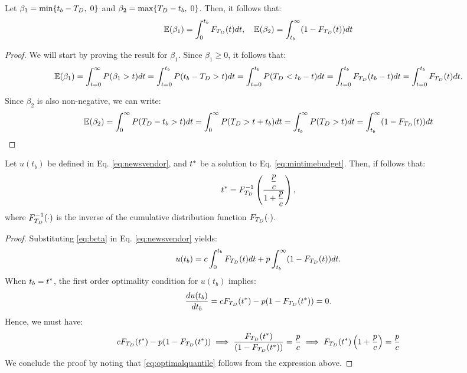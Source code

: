 \begin{lemma}
    Let $\beta_1 = \min\{ t_b - T_D, \; 0 \}$ and $\beta_2 = \max \{ T_D - t_b, \; 0 \}$. Then, it follows that:
\begin{equation} \label{eq:beta}
 \mathbb{E}(\beta_1 ) =  \int_0^{t_b} F_{T_D}(t) dt, \quad    \mathbb{E}(\beta_2 ) = \int_{t_b}^\infty (1 - F_{T_D}(t) ) dt
\end{equation}
\end{lemma}
%
\begin{proof}
We will start by proving the result for $\beta_1$. Since $\beta_1 \ge 0$, it follows that:
\begin{align*}
\mathbb{E}(\beta_1) = \int_{t=0}^\infty P ( \beta_1 > t ) dt = \int_{t=0}^{t_{b}} P( t_b - T_D > t ) dt 
=  \int_{t=0}^{t_{b}} P( T_D < t_b - t ) dt = \int_{t=0}^{t_{b}} F_{T_D}(t_b - t) dt 
= \int_{t=0}^{t_{b}} F_{T_D}(t) dt.
\end{align*}
%

Since $\beta_2$ is also non-negative, we can write:
%
\begin{align*}
    \mathbb{E}(\beta_2) =  \int_0^\infty P( T_D - t_b > t) dt = \int_0^\infty P( T_D  > t + t_b) dt
    = \int_{t_b}^\infty P( T_D  > t ) dt = \int_{t_b}^\infty (1 - F_{T_D}(t) ) dt
\end{align*}
\end{proof}

\begin{theo} \label{thm:quantile}
Let $u(t_b)$ be defined in Eq. \eqref{eq:newsvendor}, and $t^{*}$ be a solution to Eq. \eqref{eq:mintimebudget}. Then, if follows that:
%
\begin{equation} \label{eq:optimalquantile}
t^{*} = F_{T_D}^{-1} \left( \dfrac{ \dfrac{p}{c}}{1 + \dfrac{p}{c}}\right),
\end{equation}
%
where $F_{T_D}^{-1}(\cdot)$ is the inverse of the cumulative distribution function $F_{T_D}(\cdot)$.
\end{theo}
%
\begin{proof}
    Substituting \eqref{eq:beta} in Eq. \eqref{eq:newsvendor} yields:
\[
u( t_b ) = c  \int_0^{t_b} F_{T_D}(t) dt + p \int_{t_b}^\infty (1 - F_{T_D}(t) ) dt.
\]
% 
When $t_b = t^{*}$, the first order optimality condition for $u(t_b)$ implies:
%
\[
\dfrac{d u( t_b )}{d t_b} = c F_{T_D}(t^{*}) - p ( 1 - F_{T_D}(t^{*}) ) = 0.
\]
%
Hence, we must have:
%
\[
c F_{T_D}(t^{*}) - p ( 1 - F_{T_D}(t^{*}) ) \implies \dfrac{F_{T_D}(t^{*})}{( 1 - F_{T_D}(t^{*}) )} = \dfrac{p}{c} \implies F_{T_D}(t^{*}) \left( 1 + \dfrac{p}{c} \right) = \dfrac{p}{c}
\]
% 
We conclude the proof by noting that \eqref{eq:optimalquantile} follows from the expression above.
\end{proof}

